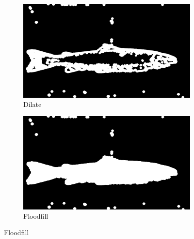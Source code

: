 \begin{figure}[H]
    \medskip
    \begin{subfigure}{0.49\textwidth}
        \includegraphics[width=\linewidth]{images/implementation/4_3_dilate}
        \caption{Dilate} 
        \label{fig:dilate_contour}
    \end{subfigure}\hspace*{\fill}
    \begin{subfigure}{0.49\textwidth}
        \includegraphics[width=\linewidth]{images/implementation/4_4_floodfill}
        \caption{Floodfill} 
        \label{fig:floodfill}
    \end{subfigure}
    

\end{figure}
